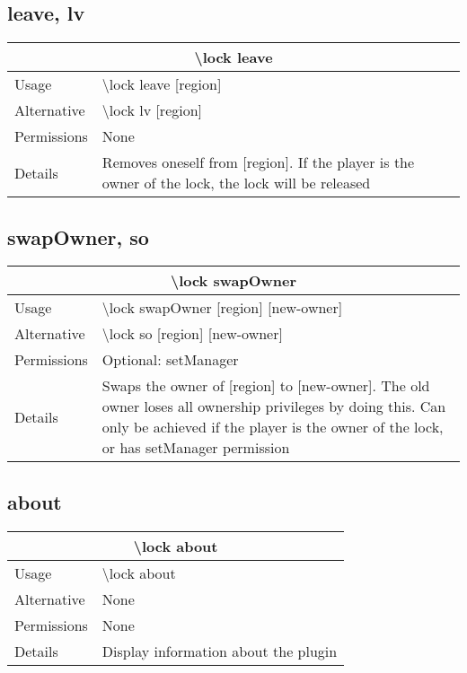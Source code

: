 \documentclass[a4paper,twoside,notitlepage,11pt]{article}
\begin{document}
\subsection{leave, lv}
\begin{center}
\begin{tabular}{|p{2cm}|p{12.5cm}|} \hline
\multicolumn{2}{|c|}{\textbf{\textbackslash lock leave}} \\ \hline
Usage       & \textbackslash lock leave [region] \\ \hline
Alternative & \textbackslash lock lv [region] \\ \hline
Permissions & None \\ \hline
Details 	& Removes oneself from [region]. If the player is the owner of the lock, the lock will be released \\ \hline
\end{tabular}
\end{center}

\subsection{swapOwner, so}
\begin{center}
\begin{tabular}{|p{2cm}|p{12.5cm}|} \hline
\multicolumn{2}{|c|}{\textbf{\textbackslash lock swapOwner}} \\ \hline
Usage       & \textbackslash lock swapOwner [region] [new-owner] \\ \hline
Alternative & \textbackslash lock so [region] [new-owner]\\ \hline
Permissions & Optional: setManager \\ \hline
Details 	& Swaps the owner of [region] to [new-owner]. The old owner loses all ownership privileges by doing this. Can only be achieved if the player is the owner of the lock, or has setManager permission \\ \hline
\end{tabular}
\end{center}

\subsection{about}
\begin{center}
\begin{tabular}{|p{2cm}|p{12.5cm}|} \hline
\multicolumn{2}{|c|}{\textbf{\textbackslash lock about}} \\ \hline
Usage       & \textbackslash lock about \\ \hline
Alternative & None \\ \hline
Permissions & None \\ \hline
Details 	& Display information about the plugin \\ \hline
\end{tabular}
\end{center}
\end{document}
